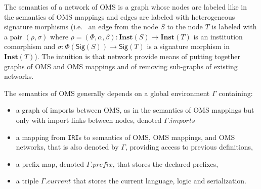 \documentclass[10pt,fleqn,final]{scrreprt}
\newcommand{\cbs}[0]{\color{red}\xspace} %
\newcommand{\cbe}[0]{\color{black}\xspace} %
\newcommand*{\syntax}[1]{\texttt{#1}}
\newcommand{\Sig}{\mathsf{Sig}}
\newcommand{\Inst}{\ensuremath{\mathbf{Inst}}}
\newcommand{\prefix}{\mathit{prefix}}
\newcommand{\current}{\mathit{current}}
\newenvironment{definitions}[0]{\medskip }{}
\begin{document}
\begin{definitions}
The semantics of a network of OMS is a graph
whose nodes are labeled like in the semantics of OMS mappings and 
edges are labeled with heterogeneous signature morphisms (i.e.~ 
an edge from the node $S$ to the node $T$ is labeled with a pair 
$(\rho, \sigma)$ where $\rho=(\Phi,\alpha,\beta):\Inst(S)\to\Inst(T)$ is an institution comorphism and
$\sigma:\Phi(\Sig(S))\to\Sig(T)$ is a signature morphism in $\Inst(T)$). 
The intuition is that
network provide means of putting together graphs of OMS and OMS mappings
and of removing sub-graphs of existing networks. 

The semantics of OMS generally depends on a global environment
$\Gamma$ containing:
 \begin{itemize}
    \item a graph of imports between OMS, as in the semantics of OMS mappings but
          only with import links between nodes, denoted $\Gamma.imports$
    \item a mapping from \syntax{IRI}s to semantics of OMS, OMS mappings, and OMS networks, that\cbs 
               is also denoted by $\Gamma$, providing access to previous definitions,\cbe
    \item a prefix map, denoted $\Gamma.\prefix$, that stores the declared prefixes,
    \item a triple $\Gamma.\current$ that stores the current language, logic and serialization. 
 \end{itemize}


\end{definitions}
\end{document}
